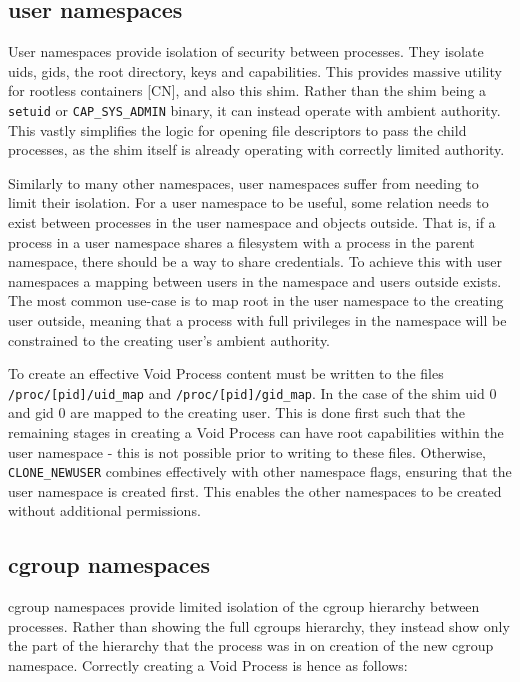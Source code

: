 \documentclass[sigplan]{acmart}
\begin{document}
\subsection{user namespaces}
\label{sec:voiding-user}

User namespaces provide isolation of security between processes. They isolate uids, gids, the root directory, keys and capabilities. This provides massive utility for rootless containers [CN], and also this shim. Rather than the shim being a \texttt{setuid} or \texttt{CAP\_SYS\_ADMIN} binary, it can instead operate with ambient authority. This vastly simplifies the logic for opening file descriptors to pass the child processes, as the shim itself is already operating with correctly limited authority.

Similarly to many other namespaces, user namespaces suffer from needing to limit their isolation. For a user namespace to be useful, some relation needs to exist between processes in the user namespace and objects outside. That is, if a process in a user namespace shares a filesystem with a process in the parent namespace, there should be a way to share credentials. To achieve this with user namespaces a mapping between users in the namespace and users outside exists. The most common use-case is to map root in the user namespace to the creating user outside, meaning that a process with full privileges in the namespace will be constrained to the creating user's ambient authority.

To create an effective Void Process content must be written to the files \texttt{/proc/[pid]/uid\_map} and \texttt{/proc/[pid]/gid\_map}. In the case of the shim uid 0 and gid 0 are mapped to the creating user. This is done first such that the remaining stages in creating a Void Process can have root capabilities within the user namespace - this is not possible prior to writing to these files. Otherwise, \texttt{CLONE\_NEWUSER} combines effectively with other namespace flags, ensuring that the user namespace is created first. This enables the other namespaces to be created without additional permissions.

\subsection{cgroup namespaces}
\label{sec:voiding-cgroup}

cgroup namespaces provide limited isolation of the cgroup hierarchy between processes. Rather than showing the full cgroups hierarchy, they instead show only the part of the hierarchy that the process was in on creation of the new cgroup namespace. Correctly creating a Void Process is hence as follows:
\end{document}
